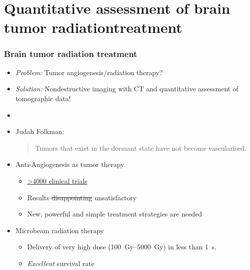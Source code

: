 \documentclass{beamer}
\newcommand{\uct}{\si{\micro}CT\xspace}
\begin{document}
\section{Quantitative assessment of brain tumor radiation\newline treatment}
\label{sec:grenoble}
\begin{frame}
	\frametitle{Brain tumor radiation treatment}
	\begin{itemize}
		\item \emph{Problem:} Tumor angiogenesis/radiation therapy?
		\pause
		\item \emph{Solution:} Nondestructive imaging with \uct and quantitative assessment of tomographic data!
		\item[]
		\pause
		\item Judah Folkman: \blockquote[\cite{Sherwood1971}]{Tumors that exist in the dormant state have not become vascularised.}
		\item Anti-Angiogenesis as tumor therapy
		\begin{itemize}
			\item \href{https://clinicaltrials.gov/ct2/results?term=antiangiogenic}{\textgreater4000 clinical trials}
			\item Results \sout{disappointing} unsatisfactory
			\item New, powerful and simple treatment strategies are needed
		\end{itemize}
		\item Microbeam radiation therapy
		\begin{itemize}
			\item Delivery of very high dose (\SIrange{100}{5000}{\gray}) in less than \SI{1}{\second}.
			\item \emph{Excellent} survival rate \cite{Laissue1998}
		\end{itemize}
	\end{itemize}
\end{frame}
\end{document}
